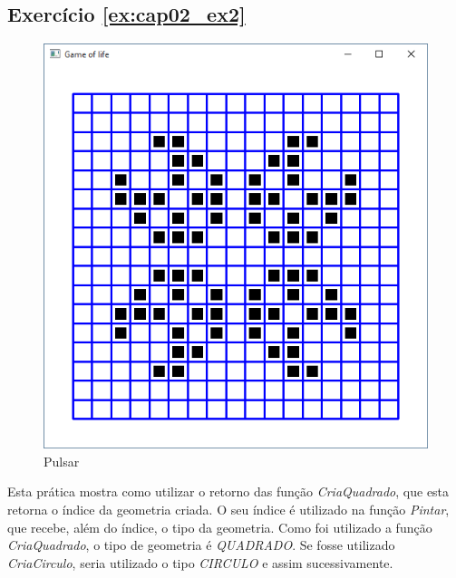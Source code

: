 \subsection*{Exercício \ref{ex:cap02_ex2}}
\begin{figure}[ht]
  \centerline{\includegraphics[width=.5\textwidth]{img/cap2_ex9.png}}
  \caption{Pulsar}
  \label{fig:cap02_ex2}
\end{figure}
Esta prática mostra como utilizar o retorno das função \emph{CriaQuadrado}, que esta retorna o índice da geometria criada. O seu índice é utilizado na função \emph{Pintar}, que recebe, além do índice, o tipo da geometria. Como foi utilizado a função \emph{CriaQuadrado}, o tipo de geometria é \emph{QUADRADO}. Se fosse utilizado \emph{CriaCirculo}, seria utilizado o tipo \emph{CIRCULO} e assim sucessivamente.

